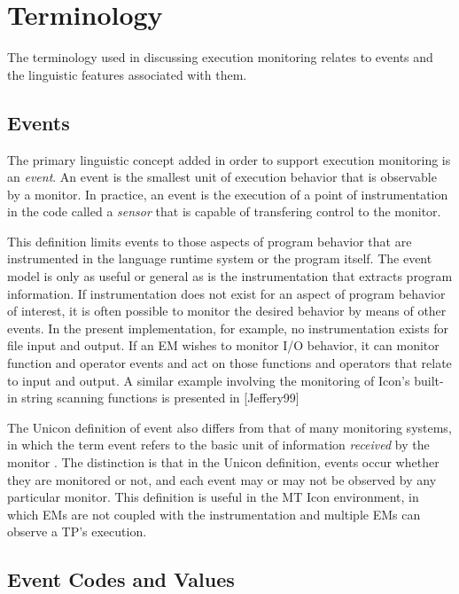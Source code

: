 \section{Terminology}

The terminology used in discussing execution monitoring relates to
events and the linguistic features associated with them.

\subsection*{Events}

The primary linguistic concept added in order to support execution 
monitoring is an {\em event\/}.  An event is the smallest unit of
execution behavior that is observable by a monitor.  In practice, an
event is the execution of a point of instrumentation in the code
called a {\em sensor\/} \cite{Ogle90} 
that is capable of transfering control to the monitor.

This definition limits events to those aspects of program behavior
that are instrumented in the language runtime system or the program
itself.  The event model is only as useful or general as is the
instrumentation that extracts program information.  If instrumentation does
not exist for an aspect of program behavior of interest, it is often
possible to monitor the desired behavior by means of other events. 
In the present implementation, for example, no instrumentation exists
for file input and output.  If an EM wishes to monitor I/O behavior, it
can monitor function and operator events and act on those functions
and operators that relate to input and output.  A similar example
involving the monitoring of Icon's built-in string scanning functions
is presented in [Jeffery99]

The Unicon definition of event also differs from that of many
monitoring systems, in which the term event refers to the basic unit
of information {\em received\/} by the monitor \cite{Bates89}.  The
distinction is that in the Unicon definition, events occur whether
they are monitored or not, and each event may or may not be observed
by any particular monitor.  This definition is useful in the MT
Icon environment, in which EMs are not coupled with the
instrumentation and multiple EMs can observe a TP's execution.

\subsection*{Event Codes and Values}

